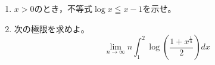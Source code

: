 \documentclass[../../main.tex]{subfiles}
\begin{document}
\begin{enumerate}
  \item
    $x>0$のとき，不等式$\log x \leqq x-1$を示せ。
  \item 次の極限を求めよ。
    \[ \lim_{n\to\infty}n\int_1^2\log \left( \frac{1+x^\frac{1}{n}}{2} \right) dx \]
\end{enumerate}
\end{document}
